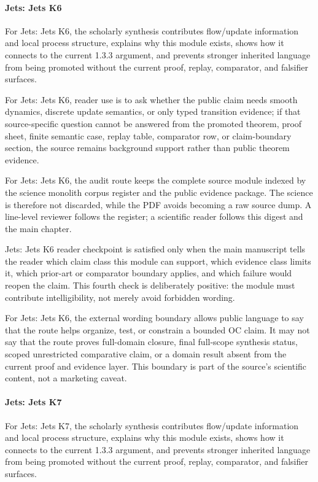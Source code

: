 \paragraph{Jets: Jets K6}

For Jets: Jets K6, the scholarly synthesis contributes flow/update information and local process structure, explains why this module exists, shows how it connects to the current 1.3.3 argument, and prevents stronger inherited language from being promoted without the current proof, replay, comparator, and falsifier surfaces.


For Jets: Jets K6, reader use is to ask whether the public claim needs smooth dynamics, discrete update semantics, or only typed transition evidence; if that source-specific question cannot be answered from the promoted theorem, proof sheet, finite semantic case, replay table, comparator row, or claim-boundary section, the source remains background support rather than public theorem evidence.


For Jets: Jets K6, the audit route keeps the complete source module indexed by the science monolith corpus register and the public evidence package. The science is therefore not discarded, while the PDF avoids becoming a raw source dump. A line-level reviewer follows the register; a scientific reader follows this digest and the main chapter.


Jets: Jets K6 reader checkpoint is satisfied only when the main manuscript tells the reader which claim class this module can support, which evidence class limits it, which prior-art or comparator boundary applies, and which failure would reopen the claim. This fourth check is deliberately positive: the module must contribute intelligibility, not merely avoid forbidden wording.


For Jets: Jets K6, the external wording boundary allows public language to say that the route helps organize, test, or constrain a bounded OC claim. It may not say that the route proves full-domain closure, final full-scope synthesis status, scoped unrestricted comparative claim, or a domain result absent from the current proof and evidence layer. This boundary is part of the source's scientific content, not a marketing caveat.


\paragraph{Jets: Jets K7}

For Jets: Jets K7, the scholarly synthesis contributes flow/update information and local process structure, explains why this module exists, shows how it connects to the current 1.3.3 argument, and prevents stronger inherited language from being promoted without the current proof, replay, comparator, and falsifier surfaces.


